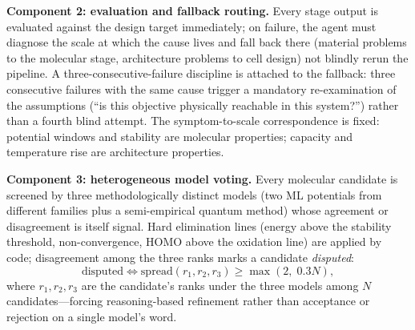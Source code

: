\textbf{Component 2: evaluation and fallback routing.} Every stage output is
evaluated against the design target immediately; on failure, the agent must
diagnose the scale at which the cause lives and fall back there (material
problems to the molecular stage, architecture problems to cell design) not
blindly rerun the pipeline. A three-consecutive-failure discipline is attached to the
fallback: three consecutive failures with the same cause trigger a
mandatory re-examination of the assumptions (``is this objective physically
reachable in this system?'') rather than a fourth blind attempt. The
symptom-to-scale correspondence is fixed: potential windows and stability
are molecular properties; capacity and temperature rise are architecture
properties.

\textbf{Component 3: heterogeneous model voting.} Every molecular candidate
is screened by three methodologically distinct models (two ML potentials
from different families plus a semi-empirical quantum method) whose
agreement or disagreement is itself signal. Hard elimination lines (energy
above the stability threshold, non-convergence, HOMO above the oxidation
line) are applied by code; disagreement among the three ranks marks a candidate
\emph{disputed}:
\begin{equation}
\label{eq:disputed}
\text{disputed} \iff \mathrm{spread}(r_1, r_2, r_3) \geq \max(2,\; 0.3 N),
\end{equation}
where $r_1, r_2, r_3$ are the candidate's ranks under the three models
among $N$ candidates---forcing reasoning-based refinement rather than
acceptance or rejection on a single model's word.

